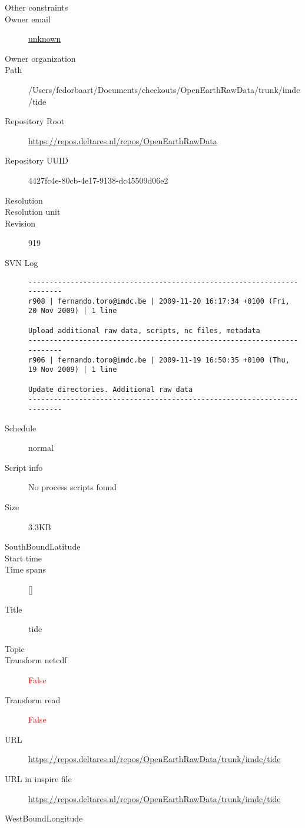 \documentclass[9]{report}
\begin{document}
\begin{description}
  \item[Other constraints] 
  \item[Owner email] \href{mailto:unknown}{unknown}
  \item[Owner organization] 
  \item[Path] /Users/fedorbaart/Documents/checkouts/OpenEarthRawData/trunk/imdc/tide
  \item[Repository Root] \href{https://repos.deltares.nl/repos/OpenEarthRawData}{https://repos.deltares.nl/repos/OpenEarthRawData}
  \item[Repository UUID] 4427fc4e-80cb-4e17-9138-dc45509d06e2
  \item[Resolution] 
  \item[Resolution unit] 
  \item[Revision] 919
  \item[SVN Log] \begin{verbatim}
------------------------------------------------------------------------
r908 | fernando.toro@imdc.be | 2009-11-20 16:17:34 +0100 (Fri, 20 Nov 2009) | 1 line

Upload additional raw data, scripts, nc files, metadata
------------------------------------------------------------------------
r906 | fernando.toro@imdc.be | 2009-11-19 16:50:35 +0100 (Thu, 19 Nov 2009) | 1 line

Update directories. Additional raw data
------------------------------------------------------------------------

\end{verbatim}
  \item[Schedule] normal
  \item[Script info] No process scripts found
  \item[Size] 3.3KB
  \item[SouthBoundLatitude] 
  \item[Start time] 
  \item[Time spans] []
  \item[Title]  tide 
  \item[Topic] 
  \item[Transform netcdf] \textcolor{red}{False}
  \item[Transform read] \textcolor{red}{False}
  \item[URL] \href{https://repos.deltares.nl/repos/OpenEarthRawData/trunk/imdc/tide}{https://repos.deltares.nl/repos/OpenEarthRawData/trunk/imdc/tide}
  \item[URL in inspire file] \href{https://repos.deltares.nl/repos/OpenEarthRawData/trunk/imdc/tide}{https://repos.deltares.nl/repos/OpenEarthRawData/trunk/imdc/tide}
  \item[WestBoundLongitude] 
\end{description}
\end{document}
